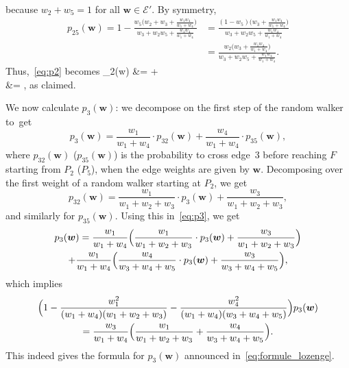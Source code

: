 \documentclass[10pt]{amsart}
\let\mathcal\mathscr
\def\ba#1\ea{\begin{align*}#1\end{align*}}
\numberwithin{equation}{section}
\theoremstyle{definition}
\let\bs\boldsymbol
\begin{document}
because $w_2 +w_5=1$ for all $\bs w\in\mathcal E'$.
By symmetry,
\begin{align*}
p_{25}(\bs w)= 1- \frac{w_5\big(w_2+w_3+\frac{w_1w_4}{w_1+w_4}\big)}{w_3+w_2w_5+\frac{w_1w_4}{w_1+w_4}}
&= \frac{(1-w_5)\big(w_3+\frac{w_1w_4}{w_1+w_4}\big)}{w_3+w_2w_5+\frac{w_1w_4}{w_1+w_4}}\\
&= \frac{w_2\big(w_3+\frac{w_1w_4}{w_1+w_4}\big)}{w_3+w_2w_5+\frac{w_1w_4}{w_1+w_4}}.
\end{align*}
Thus,~\eqref{eq:p2} becomes
\ba
p_2(\bs w)
&= \cdot {}
+\cdot{}\\
&= ,
\ea
as claimed.

We now calculate $p_3(\bs w)$: we decompose on the first step of the random walker to~get
\begin{equation}\label{eq:p3}
p_3(\bs w)
= \frac{w_1}{w_1+w_4}\cdot p_{32}(\bs w) + \frac{w_4}{w_1+w_4}\cdot p_{35}(\bs w),
\end{equation}
where $p_{32}(\bs w)$ (\resp $p_{35}(\bs w)$) is the probability to cross edge~$3$ before reaching $F$ starting from $P_2$ (\resp $P_5$), when the edge weights are given by $\bs w$.
Decomposing over the first weight of a random walker starting at $P_2$, we get
\[
p_{32}(\bs w) = \frac{w_1}{w_1+w_2+w_3}\cdot p_3(\bs w) + \frac{w_3}{w_1+w_2+w_3},
\]
and similarly for $p_{35}(\bs w)$.
Using this in~\eqref{eq:p3}, we get
\begin{multline*}
p_3(\bs w)
= \frac{w_1}{w_1+w_4}\Bigl(\frac{w_1}{w_1+w_2+w_3}\cdot p_3(\bs w) + \frac{w_3}{w_1+w_2+w_3} \Bigr)\\
+\frac{w_1}{w_1+w_4} \Bigl(\frac{w_4}{w_3+w_4+w_5}\cdot p_3(\bs w) + \frac{w_3}{w_3+w_4+w_5} \Bigr),
\end{multline*}
which implies
\begin{multline*}
\Bigl(1-\frac{w_1^2}{(w_1+w_4)(w_1+w_2+w_3)}-\frac{w_4^2}{(w_1+w_4)(w_3+w_4+w_5)} \Bigr)p_3(\bs w)\\
= \frac{w_3}{w_1+w_4} \Bigl(\frac{w_1}{w_1+w_2+w_3}+\frac{w_4}{w_3+w_4+w_5} \Bigr).
\end{multline*}
This indeed gives the formula for $p_3(\bs w)$ announced in~\eqref{eq:formule_lozenge}.
\end{document}

